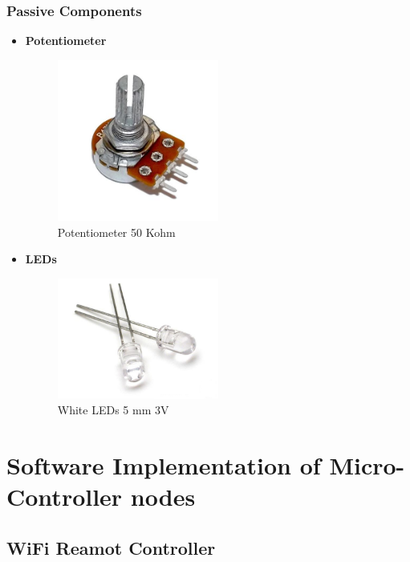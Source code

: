 \documentclass[12pt]{article}
\begin{document}
\subsubsection{Passive Components}
\begin{itemize}
	\item \textbf{Potentiometer}\\
	\begin{figure}[H]
		\centering
		\includegraphics[width =0.5\textwidth]{Fig/Electronics/pot.jpg}
		\caption{Potentiometer 50 Kohm }
		\label{fig:pot}
	\end{figure}

	\item \textbf{LEDs}\\
	\begin{figure}[H]
		\centering
		\includegraphics[width =0.5\textwidth]{Fig/Electronics/LED.jpg}
		\caption{White LEDs 5 mm 3V}
		\label{fig:led}
	\end{figure}

\end{itemize}

\newpage

\section{Software Implementation of Micro-Controller nodes}

\subsection{WiFi Reamot Controller}
\end{document}
